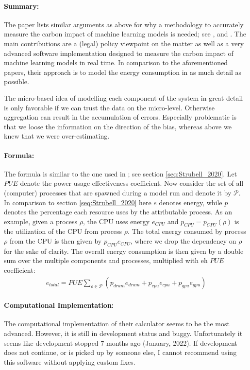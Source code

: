 \documentclass[a4paper, 12pt]{article}
\begin{document}
\paragraph{Summary:} The paper lists similar arguments as above for why a methodology to
accurately measure the carbon impact of machine learning models is needed; see
,  and . The main
contributions are a (legal) policy viewpoint on the matter as well as a very advanced
software implementation designed to measure the carbon impact of machine learning models
in real time. In comparison to the aforementioned papers, their approach is to model the
energy consumption in as much detail as possible.

The micro-based idea of modelling each component of the system in great detail is only
favorable if we can trust the data on the micro-level. Otherwise aggregation can result
in the accumulation of errors. Especially problematic is that we loose the information
on the direction of the bias, whereas above we knew that we were over-estimating.

\paragraph{Formula:} The formula is similar to the one used in ;
see section \ref{seq:Strubell_2020}. Let $PUE$ denote the power usage effectiveness
coefficient. Now consider the set of all (computer) processes that are spawned during a
model run and denote it by $\mathcal{P}$. In comparison to section
\ref{seq:Strubell_2020} here $e$ denotes energy, while $p$ denotes the percentage each
resource uses by the attributable process. As an example, given a process $\rho$, the
CPU uses energy $e_{CPU}$ and $p_{CPU} = p_{CPU}(\rho)$ is the utilization of the CPU
from process $\rho$. The total energy consumed by process $\rho$ from the CPU is then
given by $p_{CPU} e_{CPU}$, where we drop the dependency on $\rho$ for the sake of
clarity. The overall energy consumption is then given by a double sum over the multiple
components and processes, multiplied with eh $PUE$ coefficient:
\begin{align}
    e_{total} = PUE \sum_{\rho \in \mathcal{P}} (p_{dram} e_{dram} + p_{cpu} e_{cpu} +
    p_{gpu} e_{gpu})
\end{align}

\paragraph{Computational Implementation:} The computational implementation of their
calculator seems to be the most advanced. However, it is still in development status and
buggy. Unfortunately it seems like development stopped 7 months ago (January, 2022). If
development does not continue, or is picked up by someone else, I cannot recommend using
this software without applying custom fixes.
\end{document}
